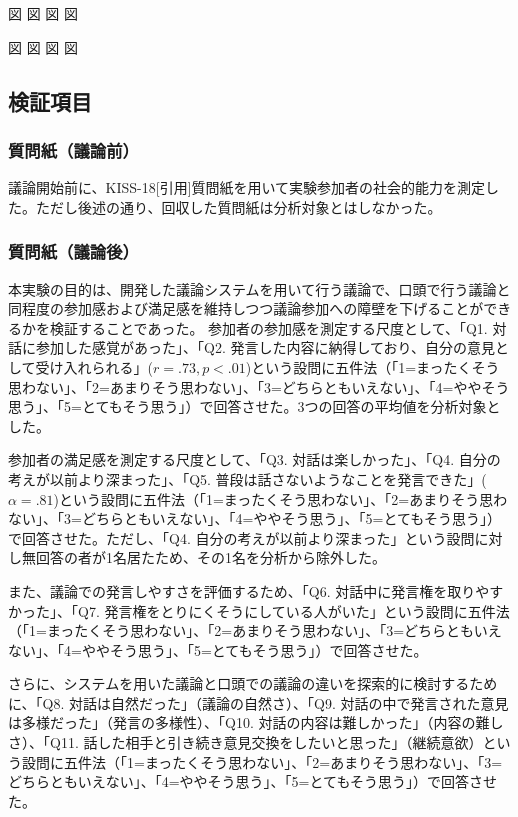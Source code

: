 \documentclass[11pt, a4paper]{jreport} %
\begin{document}
図
図
図
図


図
図
図
図



\subsection{検証項目}


\subsubsection*{質問紙（議論前）}
議論開始前に、KISS-18[引用]質問紙を用いて実験参加者の社会的能力を測定した。ただし後述の通り、回収した質問紙は分析対象とはしなかった。

\subsubsection*{質問紙（議論後）}

本実験の目的は、開発した議論システムを用いて行う議論で、口頭で行う議論と同程度の参加感および満足感を維持しつつ議論参加への障壁を下げることができるかを検証することであった。
参加者の参加感を測定する尺度として、「Q1. 対話に参加した感覚があった」、「Q2. 発言した内容に納得しており、自分の意見として受け入れられる」($r=.73, p<.01$)という設問に五件法（「1=まったくそう思わない」、「2=あまりそう思わない」、「3=どちらともいえない」、「4=ややそう思う」、「5=とてもそう思う」）で回答させた。3つの回答の平均値を分析対象とした。

参加者の満足感を測定する尺度として、「Q3. 対話は楽しかった」、「Q4. 自分の考えが以前より深まった」、「Q5. 普段は話さないようなことを発言できた」($\alpha =.81$)という設問に五件法（「1=まったくそう思わない」、「2=あまりそう思わない」、「3=どちらともいえない」、「4=ややそう思う」、「5=とてもそう思う」）で回答させた。ただし、「Q4. 自分の考えが以前より深まった」という設問に対し無回答の者が1名居たため、その1名を分析から除外した。


また、議論での発言しやすさを評価するため、「Q6. 対話中に発言権を取りやすかった」、「Q7. 発言権をとりにくそうにしている人がいた」という設問に五件法（「1=まったくそう思わない」、「2=あまりそう思わない」、「3=どちらともいえない」、「4=ややそう思う」、「5=とてもそう思う」）で回答させた。



さらに、システムを用いた議論と口頭での議論の違いを探索的に検討するために、「Q8. 対話は自然だった」（議論の自然さ）、「Q9. 対話の中で発言された意見は多様だった」（発言の多様性）、「Q10. 対話の内容は難しかった」（内容の難しさ）、「Q11. 話した相手と引き続き意見交換をしたいと思った」（継続意欲）という設問に五件法（「1=まったくそう思わない」、「2=あまりそう思わない」、「3=どちらともいえない」、「4=ややそう思う」、「5=とてもそう思う」）で回答させた。
\end{document}
